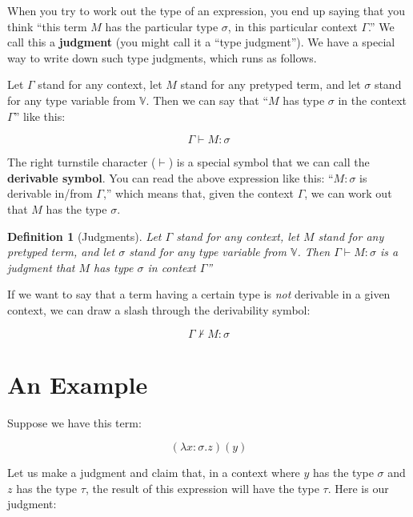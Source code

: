 \documentclass{book}
\numberwithin{equation}{chapter}
\newcommand{\vocab}{\textbf}
\newtheorem{definition}{Definition}
\begin{document}
When you try to work out the type of an expression, you end up saying that you think ``this term $M$ has the particular type $\sigma$, in this particular context $\Gamma$.'' We call this a \vocab{judgment} (you might call it a ``type judgment''). We have a special way to write down such type judgments, which runs as follows.

Let $\Gamma$ stand for any context, let $M$ stand for any pretyped term, and let $\sigma$ stand for any type variable from $\mathbb{V}$. Then we can say that ``$M$ has type $\sigma$ in the context $\Gamma$'' like this:

\begin{equation}
\Gamma \vdash M : \sigma
\end{equation}

\noindent
The right turnstile character ($\vdash$) is a special symbol that we can call the \vocab{derivable symbol}. You can read the above expression like this: ``$M : \sigma$ is derivable in/from $\Gamma$,'' which means that, given the context $\Gamma$, we can work out that $M$ has the type $\sigma$.

\begin{definition}[Judgments]
Let $\Gamma$ stand for any context, let $M$ stand for any pretyped term, and let $\sigma$ stand for any type variable from $\mathbb{V}$. Then $\Gamma \vdash M : \sigma$ is a judgment that $M$ has type $\sigma$ in context $\Gamma$''
\end{definition}

\noindent
If  we want to say that a term having a certain type is \textit{not} derivable in a given context, we can draw a slash through the derivability symbol:

\begin{equation}
\Gamma \not \vdash M : \sigma
\end{equation}


\section{An Example}

\noindent
Suppose we have this term:

\begin{equation}
(\lambda x : \sigma.z) (y)
\end{equation}

\noindent
Let us make a judgment and claim that, in a context where $y$ has the type $\sigma$ and $z$ has the type $\tau$, the result of this expression will have the type $\tau$. Here is our judgment:
\end{document}
